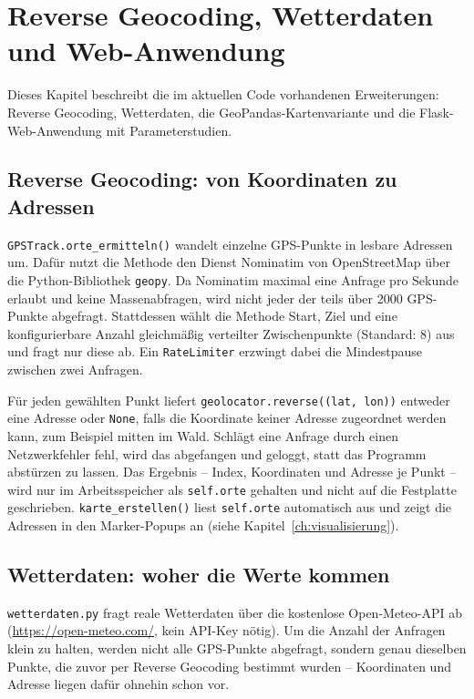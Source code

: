 \chapter{Reverse Geocoding, Wetterdaten und Web-Anwendung}
\label{ch:erweiterungen-detail}

Dieses Kapitel beschreibt die im aktuellen Code vorhandenen Erweiterungen: Reverse Geocoding, Wetterdaten, die GeoPandas-Kartenvariante und die Flask-Web-Anwendung mit Parameterstudien.

\section{Reverse Geocoding: von Koordinaten zu Adressen}

\texttt{GPSTrack.orte\_ermitteln()} wandelt einzelne GPS-Punkte in lesbare Adressen um. Dafür nutzt die Methode den Dienst Nominatim von OpenStreetMap über die Python-Bibliothek \texttt{geopy}. Da Nominatim maximal eine Anfrage pro Sekunde erlaubt und keine Massenabfragen, wird nicht jeder der teils über 2000 GPS-Punkte abgefragt. Stattdessen wählt die Methode Start, Ziel und eine konfigurierbare Anzahl gleichmäßig verteilter Zwischenpunkte (Standard: 8) aus und fragt nur diese ab. Ein \texttt{RateLimiter} erzwingt dabei die Mindestpause zwischen zwei Anfragen.

Für jeden gewählten Punkt liefert \texttt{geolocator.reverse((lat, lon))} entweder eine Adresse oder \texttt{None}, falls die Koordinate keiner Adresse zugeordnet werden kann, zum Beispiel mitten im Wald. Schlägt eine Anfrage durch einen Netzwerkfehler fehl, wird das abgefangen und geloggt, statt das Programm abstürzen zu lassen. Das Ergebnis -- Index, Koordinaten und Adresse je Punkt -- wird nur im Arbeitsspeicher als \texttt{self.orte} gehalten und nicht auf die Festplatte geschrieben. \texttt{karte\_erstellen()} liest \texttt{self.orte} automatisch aus und zeigt die Adressen in den Marker-Popups an (siehe Kapitel~\ref{ch:visualisierung}).

\section{Wetterdaten: woher die Werte kommen}

\texttt{wetterdaten.py} fragt reale Wetterdaten über die kostenlose Open-Meteo-API ab (\url{https://open-meteo.com/}, kein API-Key nötig). Um die Anzahl der Anfragen klein zu halten, werden nicht alle GPS-Punkte abgefragt, sondern genau dieselben Punkte, die zuvor per Reverse Geocoding bestimmt wurden -- Koordinaten und Adresse liegen dafür ohnehin schon vor.

